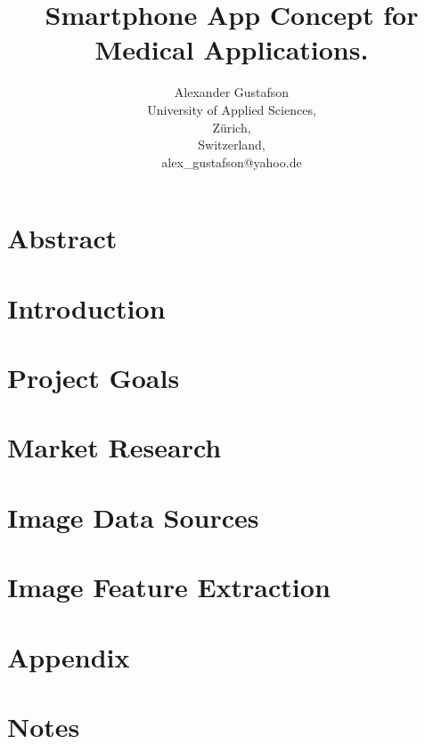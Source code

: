 \documentclass{report}
\title{Smartphone App Concept for Medical Applications.}
\author{Alexander Gustafson\\
  University of Applied Sciences,\\
  Zürich,\\
  Switzerland,\\
  alex\_gustafson@yahoo.de}
\date{\parbox{\linewidth}{\centering%
  \today\endgraf\bigskip
  Dozent: Reto Knaack (knaa@zhaw.ch)\endgraf\bigskip
  School of Engineering, Abteilung Zürich \endgraf
  Studiengang Informatik\endgraf
  }}
\begin{document}
\maketitle



\chapter*{Abstract}



\tableofcontents

\chapter{Introduction}


\chapter{Project Goals}

\chapter{Market Research}



\chapter{Image Data Sources}


\chapter{Image Feature Extraction}




{}


\chapter{Appendix}

\chapter{Notes}

\end{document}
